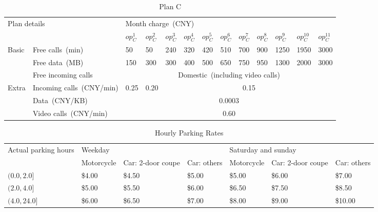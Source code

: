 \documentclass[10pt,journal,compsoc]{IEEEtran}
\begin{document}
\begin{table}[hbtp]
  \caption{Plan C}
  \label{table:chinaA}
  \centering
  \begin{tabular}{lllllllllllll} \toprule
  \multicolumn{2}{l}{\multirow{2}{*}{Plan details}}                 &\multicolumn{11}{l}{Month charge~(CNY)} \\ \cmidrule(lr){3-13}
  \multicolumn{2}{l}{}                                                        &\!$op_C^1$\!  &\!$op_C^2$\!  &\!$op_C^3$\!  &\!$op_C^4$\!  &\!$op_C^5$\!  &\!$op_C^6$\! &\!$op_C^7$\!  &\!$op_C^8$\!  &\!$op_C^9$\!  &\!$op_C^{10}$\!  &\!$op_C^{11}$\! \\ \midrule
  \multirow{3}{*}{Basic} &Free calls~(min)  &50  &50  &240  &320  &420  &510  &700 &900 &1250 &1950  &3000 \\
                                            &Free data~(MB)  &150 &300 &300  &400  &500  &650  &750 &950 &1300 &2000  &3000 \\
                                            &Free incoming calls  &\multicolumn{11}{c}{Domestic~(including video calls)} \\ \midrule
  \multirow{3}{*}{Extra} &Incoming calls~(CNY/min)  &0.25 &0.20  &\multicolumn{9}{c}{0.15} \\
                                           &Data~(CNY/KB)  &\multicolumn{11}{c}{0.0003} \\
                                            &Video calls~(CNY/min)  &\multicolumn{11}{c}{0.60} \\ \bottomrule
  \end{tabular}
\end{table}

\begin{table}
  \caption{Hourly Parking Rates}
  \label{tab:hourlyRate}
  \centering
  \begin{tabular}{lllllll} \toprule
  \multirow{2}{*}{Actual parking hours} &\multicolumn{3}{l}{Weekday}&\multicolumn{3}{l}{Saturday and sunday} \\ \cmidrule(lr){2-4} \cmidrule(lr){5-7}
                                  &Motorcycle  &Car: 2-door coupe  &Car: others    &Motorcycle  &Car: 2-door coupe  &Car: others \\ \midrule
  $(0.0,2.0]$                     &\$4.00        &\$4.50          &\$5.00      &\$5.00        &\$6.00        &\$7.00 \\
  $(2.0,4.0]$                     &\$5.00        &\$5.50          &\$6.00      &\$6.50      &\$7.50        &\$8.50  \\
  $(4.0,24.0]$                    &\$6.00        &\$6.50          &\$7.00      &\$8.00      &\$9.00        &\$10.00  \\ \bottomrule
  \end{tabular}
\end{table}
\end{document}

